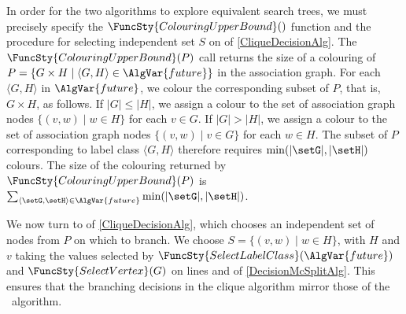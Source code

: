 In order for the two algorithms
to explore equivalent search trees, we must precisely specify
the $\FuncSty{ColouringUpperBound}()$ function and the procedure for selecting independent set $S$ on
 of \cref{CliqueDecisionAlg}.  The $\FuncSty{ColouringUpperBound}(P)$ call
returns the size of a colouring of $P = \{G \times H \mid \langle G,H \rangle \in \AlgVar{future}\}$
in the association graph.  For each $\langle G, H\rangle$ in $\AlgVar{future}$, we colour the corresponding
subset of $P$, that is, $G \times H$, as follows.  If $|G| \leq |H|$, we assign a colour to the set
of association graph nodes $\{(v,w) \mid w \in H\}$ for each $v \in G$.  If $|G| > |H|$, we assign
a colour to the set of association graph nodes $\{(v,w) \mid v \in G\}$ for each $w \in H$.
The subset of $P$ corresponding to label class $\langle G,H \rangle$ therefore requires
$\min(|\setG|,|\setH|)$ colours.
The size of the colouring returned by $\FuncSty{ColouringUpperBound}(P)$ is
$\sum_{\langle \setG,\setH \rangle \in \AlgVar{future}} \min(|\setG|,|\setH|)$.

We now turn to  of \cref{CliqueDecisionAlg}, which chooses an independent
set of nodes from $P$ on which to branch.  We choose $S = \{(v,w) \mid w \in H\}$, with $H$
and $v$ taking the values selected by $\FuncSty{SelectLabelClass}(\AlgVar{future})$
and $\FuncSty{SelectVertex}(G)$ on lines  and 
of \cref{DecisionMcSplitAlg}.  This ensures that the branching decisions in the clique algorithm
mirror those of the \McSplit\ algorithm.

